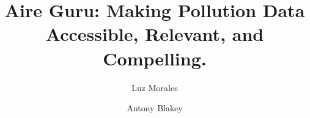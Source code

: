 \begin{frontmatter}

\title{Aire Guru: Making Pollution Data Accessible, Relevant, and Compelling.}

\author{Luz Morales}
\author{Antony Blakey}
\address{Illuminous\\ Johan van Hasseltweg 43-II, 1021 KN, Amsterdam}

\begin{comment}
\begin{abstract}
input{contents/frontmatter/abstract} 
\end{abstract}   

\begin{keyword}
Air Quality Index \sep Pollution \sep Monitoring \sep Visualization \sep Analysis \sep Big Data
\sep Accessible \sep Relevant \sep Compelling
\end{keyword}
\end{comment}

\end{frontmatter}